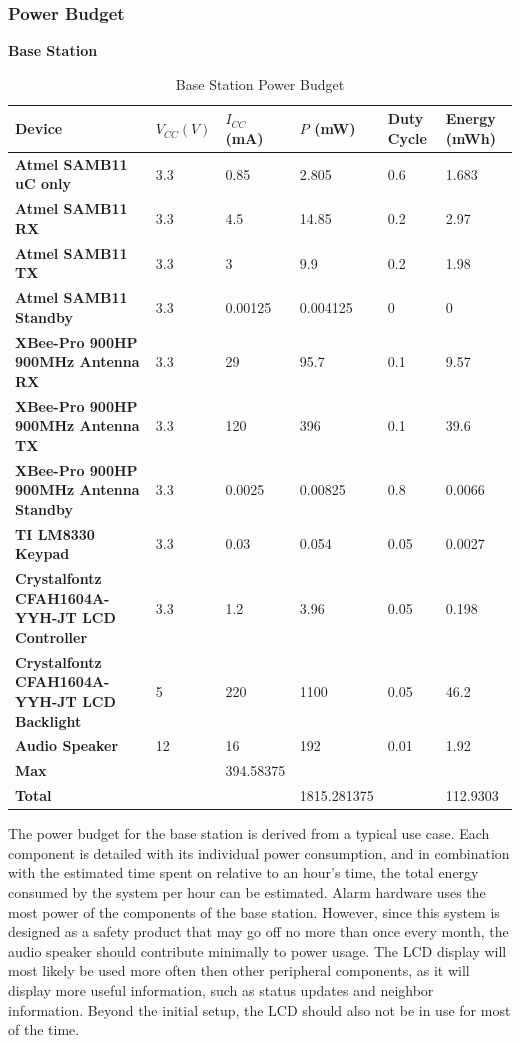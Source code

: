 \documentclass[journal,compsoc]{IEEEtran}
\begin{document}
\subsubsection{Power Budget}

\textbf{Base Station}

\begin{table}[t]
  \centering
  \begin{tabular}{>{\bfseries}l|l l l l l}
    Device & $V_{CC} (V)$ & $I_{CC}$ (mA) & $P$ (mW) & Duty Cycle & Energy (mWh) \\
    \hline
    Atmel SAMB11 uC only & 3.3 & 0.85 & 2.805 & 0.6 & 1.683 \\
    Atmel SAMB11 RX & 3.3 & 4.5 & 14.85 & 0.2 & 2.97 \\
    Atmel SAMB11 TX & 3.3 & 3 & 9.9 & 0.2 & 1.98 \\
    Atmel SAMB11 Standby & 3.3 & 0.00125 & 0.004125 & 0 & 0 \\
    XBee-Pro 900HP 900MHz Antenna RX & 3.3 & 29 & 95.7 & 0.1 & 9.57 \\
    XBee-Pro 900HP 900MHz Antenna TX & 3.3 & 120 & 396 & 0.1 & 39.6 \\
    XBee-Pro 900HP 900MHz Antenna Standby & 3.3 & 0.0025 & 0.00825 & 0.8 & 0.0066 \\
    TI LM8330 Keypad & 3.3 & 0.03 & 0.054 & 0.05 & 0.0027 \\
    Crystalfontz CFAH1604A-YYH-JT LCD Controller & 3.3 & 1.2 & 3.96 & 0.05 & 0.198 \\
    Crystalfontz CFAH1604A-YYH-JT LCD Backlight & 5 & 220 & 1100 & 0.05 & 46.2 \\
    Audio Speaker & 12 & 16 & 192 & 0.01 & 1.92 \\
    \hline
    Max & & 394.58375 & & & \\
    Total & & & 1815.281375 & & 112.9303
  \end{tabular}
  \caption{Base Station Power Budget}
\end{table}

The power budget for the base station is derived from a typical use case.  Each component is detailed with its individual power consumption, and in combination with the estimated time spent on relative to an hour’s time, the total energy consumed by the system per hour can be estimated.  Alarm hardware uses the most power of the components of the base station.  However, since this system is designed as a safety product that may go off no more than once every month, the audio speaker should contribute minimally to power usage.  The LCD display will most likely be used more often then other peripheral components, as it will display more useful information, such as status updates and neighbor information.  Beyond the initial setup, the LCD should also not be in use for most of the time.
\end{document}
